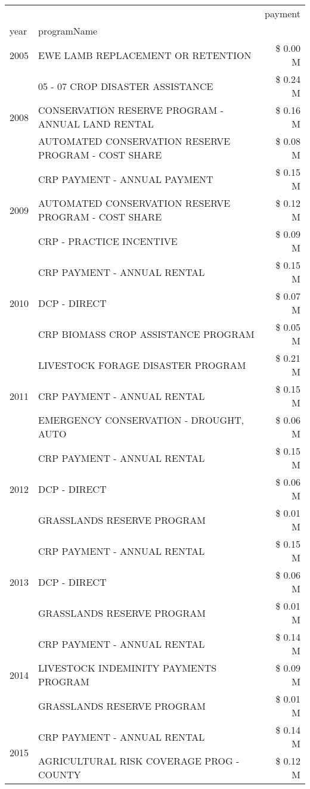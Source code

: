 \begin{tabular}{llr}
\toprule
 &  & payment \\
year & programName &  \\
\midrule
2005 & EWE LAMB REPLACEMENT OR RETENTION & \$ 0.00 M \\
\cline{1-3}
\multirow[t]{3}{*}{2008} & 05 - 07 CROP DISASTER ASSISTANCE & \$ 0.24 M \\
 & CONSERVATION RESERVE PROGRAM - ANNUAL LAND RENTAL & \$ 0.16 M \\
 & AUTOMATED CONSERVATION RESERVE PROGRAM - COST SHARE & \$ 0.08 M \\
\cline{1-3}
\multirow[t]{3}{*}{2009} & CRP PAYMENT - ANNUAL PAYMENT & \$ 0.15 M \\
 & AUTOMATED CONSERVATION RESERVE PROGRAM - COST SHARE & \$ 0.12 M \\
 & CRP - PRACTICE INCENTIVE & \$ 0.09 M \\
\cline{1-3}
\multirow[t]{3}{*}{2010} & CRP PAYMENT - ANNUAL RENTAL & \$ 0.15 M \\
 & DCP - DIRECT & \$ 0.07 M \\
 & CRP BIOMASS CROP ASSISTANCE PROGRAM & \$ 0.05 M \\
\cline{1-3}
\multirow[t]{3}{*}{2011} & LIVESTOCK FORAGE DISASTER PROGRAM & \$ 0.21 M \\
 & CRP PAYMENT - ANNUAL RENTAL & \$ 0.15 M \\
 & EMERGENCY CONSERVATION - DROUGHT, AUTO & \$ 0.06 M \\
\cline{1-3}
\multirow[t]{3}{*}{2012} & CRP PAYMENT - ANNUAL RENTAL & \$ 0.15 M \\
 & DCP - DIRECT & \$ 0.06 M \\
 & GRASSLANDS RESERVE PROGRAM & \$ 0.01 M \\
\cline{1-3}
\multirow[t]{3}{*}{2013} & CRP PAYMENT - ANNUAL RENTAL & \$ 0.15 M \\
 & DCP - DIRECT & \$ 0.06 M \\
 & GRASSLANDS RESERVE PROGRAM & \$ 0.01 M \\
\cline{1-3}
\multirow[t]{3}{*}{2014} & CRP PAYMENT - ANNUAL RENTAL & \$ 0.14 M \\
 & LIVESTOCK INDEMINITY PAYMENTS PROGRAM & \$ 0.09 M \\
 & GRASSLANDS RESERVE PROGRAM & \$ 0.01 M \\
\cline{1-3}
\multirow[t]{3}{*}{2015} & CRP PAYMENT - ANNUAL RENTAL & \$ 0.14 M \\
 & AGRICULTURAL RISK COVERAGE PROG - COUNTY & \$ 0.12 M \\

\end{tabular}

